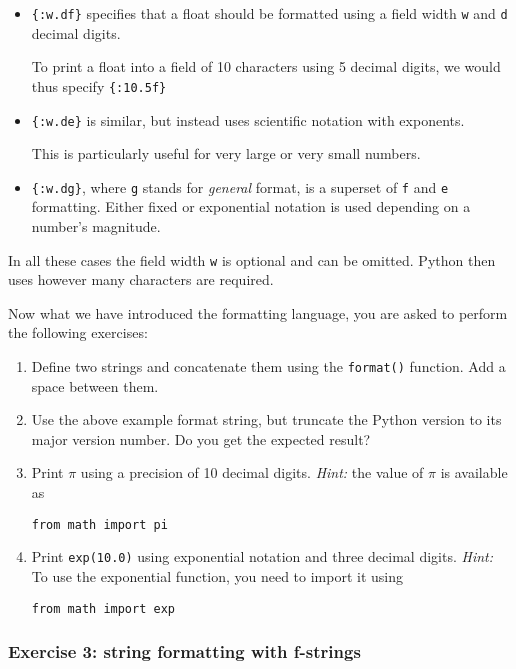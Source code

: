 \documentclass{scrartcl}
\begin{document}
\begin{itemize}
\item
  \texttt{\{:w.df\}} specifies that a float should be formatted using a
  field width \texttt{w} and \texttt{d} decimal digits.

  To print a float into a field of 10 characters using 5 decimal digits,
  we would thus specify \texttt{\{:10.5f\}}
\item
  \texttt{\{:w.de\}} is similar, but instead uses scientific notation
  with exponents.

  This is particularly useful for very large or very small numbers.
\item
  \texttt{\{:w.dg\}}, where \texttt{g} stands for \emph{general} format,
  is a superset of \texttt{f} and \texttt{e} formatting. Either fixed or
  exponential notation is used depending on a number's magnitude.
\end{itemize}

In all these cases the field width \texttt{w} is optional and can be
omitted. Python then uses however many characters are required.

Now what we have introduced the formatting language, you are asked to
perform the following exercises:

\begin{enumerate}
\def\labelenumi{\arabic{enumi}.}
\item
  Define two strings and concatenate them using the \texttt{format()}
  function. Add a space between them.
\item
  Use the above example format string, but truncate the Python version
  to its major version number. Do you get the expected result?
\item
  Print \(\pi\) using a precision of 10 decimal digits. \emph{Hint:} the
  value of \(\pi\) is available as

\begin{verbatim}
from math import pi
\end{verbatim}
\item
  Print \texttt{exp(10.0)} using exponential notation and three decimal
  digits. \emph{Hint:} To use the exponential function, you need to
  import it using

\begin{verbatim}
from math import exp
\end{verbatim}
\end{enumerate}

    \hypertarget{exercise-3-string-formatting-with-f-strings}{%
\subsubsection{Exercise 3: string formatting with
f-strings}\label{exercise-3-string-formatting-with-f-strings}}
\end{document}
